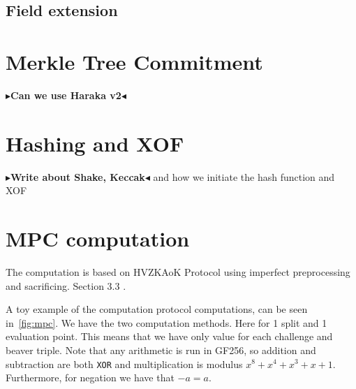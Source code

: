 \documentclass[twoside,11pt,openright]{report}
\theoremstyle{definition}
\theoremstyle{plain}
\newcommand{\todo}[1]{{\color[rgb]{.5,0,0}\textbf{$\blacktriangleright$#1$\blacktriangleleft$}}}
\begin{document}
\subsection{Field extension}

\section{Merkle Tree Commitment}

\todo{Can we use Haraka v2}

\section{Hashing and XOF}

\todo{Write about Shake, Keccak} and how we initiate the hash function and XOF

\section{MPC computation}

The computation is based on HVZKAoK Protocol using imperfect preprocessing and sacrificing. Section 3.3 \cite{baum2020concretely}.

A toy example of the computation protocol computations, can be seen in~\autoref{fig:mpc}. We have the two computation methods. Here for 1 split and 1 evaluation point. This means that we have only value for each challenge and beaver triple. Note that any arithmetic is run in GF256, so addition and subtraction are both \texttt{XOR} and multiplication is modulus $x^8 + x^4 + x^3 + x + 1$. Furthermore, for negation we have that $-a = a$.
\end{document}
